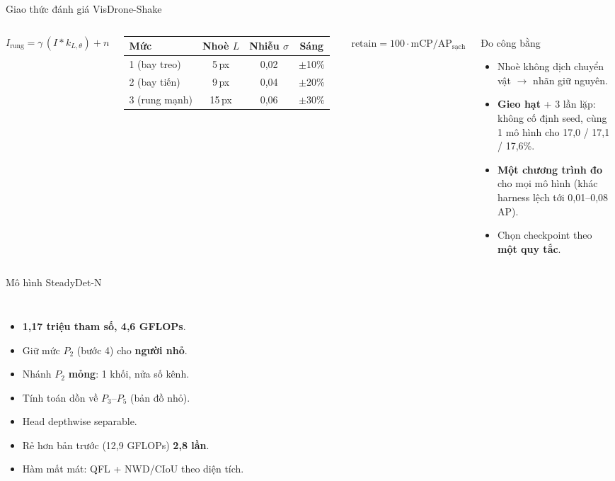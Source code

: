 \documentclass[aspectratio=169,11pt]{beamer}
\newcommand{\so}[1]{{\color{dam}\bfseries #1}}
\begin{document}
\begin{frame}{Giao thức đánh giá VisDrone-Shake}
\begin{columns}[T]
\[
I_{\text{rung}} = \gamma\,(I * k_{L,\theta}) + n
\]
\small
\begin{tabular}{@{}lccc@{}}
\toprule
\textbf{Mức} & \textbf{Nhoè $L$} & \textbf{Nhiễu $\sigma$} & \textbf{Sáng}\\\midrule
1 (bay treo) & 5\,px & 0,02 & $\pm$10\%\\
2 (bay tiến) & 9\,px & 0,04 & $\pm$20\%\\
3 (rung mạnh) & 15\,px & 0,06 & $\pm$30\%\\\bottomrule
\end{tabular}

\vspace{6pt}
$\mathrm{retain} = 100\cdot\mathrm{mCP}/\mathrm{AP}_{\text{sạch}}$
\begin{block}{Đo công bằng}
\begin{itemize}\small
\item Nhoè không dịch chuyển vật $\rightarrow$ nhãn giữ nguyên.
\item \textbf{Gieo hạt} + 3 lần lặp: không cố định seed, cùng 1 mô hình cho 17,0 / 17,1 / 17,6\%.
\item \textbf{Một chương trình đo} cho mọi mô hình (khác harness lệch tới 0,01--0,08 AP).
\item Chọn checkpoint theo \textbf{một quy tắc}.
\end{itemize}
\end{block}
\end{columns}
\end{frame}

\begin{frame}{Mô hình SteadyDet-N}
\begin{columns}[c]
\centering\resizebox{!}{0.8\textheight}{}
\begin{itemize}\footnotesize
\item \so{1,17 triệu tham số, 4,6 GFLOPs}.
\item Giữ mức $P_2$ (bước 4) cho \textbf{người nhỏ}.
\item Nhánh $P_2$ \textbf{mỏng}: 1 khối, nửa số kênh.
\item Tính toán dồn về $P_3$--$P_5$ (bản đồ nhỏ).
\item Head depthwise separable.
\item Rẻ hơn bản trước (12,9 GFLOPs) \textbf{2,8 lần}.
\item Hàm mất mát: QFL + NWD/CIoU theo diện tích.
\end{itemize}
\end{columns}
\end{frame}
\end{document}
